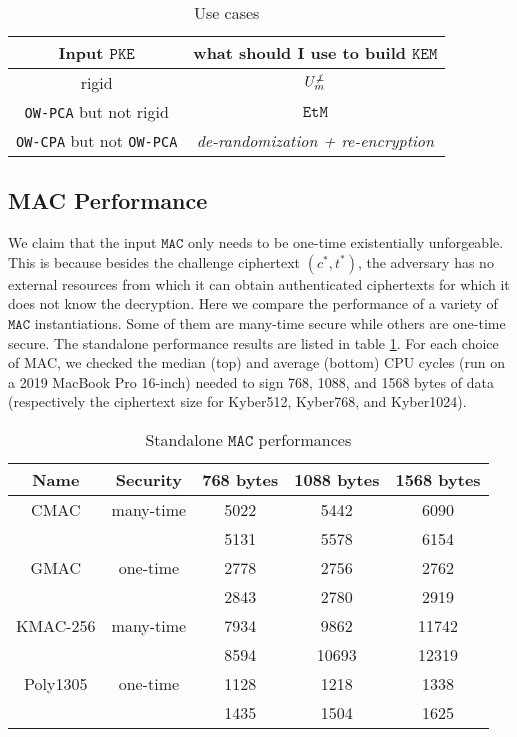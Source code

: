 \documentclass[floatrow,journal=tches,submission]{iacrtrans}
\newcommand{\pke}{\texttt{PKE}}
\newcommand{\kem}{\texttt{KEM}}
\newcommand{\etm}{\texttt{EtM}}  %
\newcommand{\mac}{\texttt{MAC}}
\begin{document}
\begin{table}[H]
    \begin{tabular}{|c|c|}
        \hline
        Input $\pke$ & what should I use to build $\kem$ \\
        \hline
        rigid & $U^{\not\bot}_m$ \\
        \hline
        \texttt{OW-PCA} but not rigid & $\etm$ \\
        \hline
        \texttt{OW-CPA} but not \texttt{OW-PCA} & \emph{de-randomization + re-encryption} \\
        \hline
    \end{tabular}
    \caption{Use cases}
\end{table}

\subsection{MAC Performance}\label{sec:mac-performance}
We claim that the input $\mac$ only needs to be one-time existentially unforgeable. This is because besides the challenge ciphertext $(c^\ast, t^\ast)$, the adversary has no external resources from which it can obtain authenticated ciphertexts for which it does not know the decryption. Here we compare the performance of a variety of $\mac$ instantiations. Some of them are many-time secure while others are one-time secure. The standalone performance results are listed in table \ref{tbl:standalone-mac-perf}. For each choice of MAC, we checked the median (top) and average (bottom) CPU cycles (run on a 2019 MacBook Pro 16-inch) needed to sign 768, 1088, and 1568 bytes of data (respectively the ciphertext size for Kyber512, Kyber768, and Kyber1024).

\begin{table}[H]
    \centering
    \begin{tabular}{|c|c|c|c|c|}
        \hline
        Name & Security & 768 bytes & 1088 bytes & 1568 bytes \\
        \hline
        CMAC & many-time & 5022 & 5442 & 6090 \\
        & & 5131 & 5578 & 6154 \\
        \hline
        GMAC & one-time & 2778 & 2756 & 2762 \\
        & & 2843 & 2780 & 2919 \\
        \hline
        KMAC-256 & many-time & 7934 & 9862 & 11742 \\
        & & 8594 & 10693 & 12319 \\
        \hline
        Poly1305 & one-time & 1128 & 1218 & 1338 \\
        & & 1435 & 1504 & 1625 \\
        \hline
    \end{tabular}
    \caption{Standalone $\mac$ performances}\label{tbl:standalone-mac-perf}
\end{table}
\end{document}
